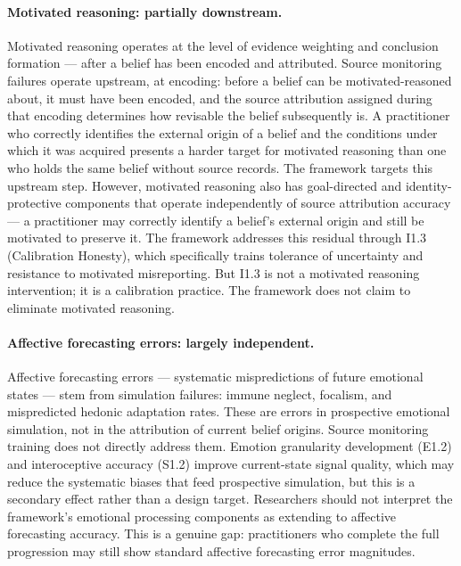 \documentclass[12pt, a4paper]{article}
\begin{document}
\paragraph{Motivated reasoning: partially downstream.}
Motivated reasoning operates at the level of evidence weighting and conclusion
formation --- after a belief has been encoded and attributed. Source monitoring
failures operate upstream, at encoding: before a belief can be motivated-reasoned
about, it must have been encoded, and the source attribution assigned during that
encoding determines how revisable the belief subsequently is. A practitioner who
correctly identifies the external origin of a belief and the conditions under
which it was acquired presents a harder target for motivated reasoning than one
who holds the same belief without source records. The framework targets this
upstream step. However, motivated reasoning also has goal-directed and
identity-protective components that operate independently of source attribution
accuracy --- a practitioner may correctly identify a belief's external origin and
still be motivated to preserve it. The framework addresses this residual through
I1.3 (Calibration Honesty), which specifically trains tolerance of uncertainty
and resistance to motivated misreporting. But I1.3 is not a motivated reasoning
intervention; it is a calibration practice. The framework does not claim to
eliminate motivated reasoning.

\paragraph{Affective forecasting errors: largely independent.}
Affective forecasting errors --- systematic mispredictions of future emotional
states --- stem from simulation failures: immune neglect, focalism, and
mispredicted hedonic adaptation rates. These are errors in prospective emotional
simulation, not in the attribution of current belief origins. Source monitoring
training does not directly address them. Emotion granularity development (E1.2)
and interoceptive accuracy (S1.2) improve current-state signal quality, which
may reduce the systematic biases that feed prospective simulation, but this is
a secondary effect rather than a design target. Researchers should not interpret
the framework's emotional processing components as extending to affective
forecasting accuracy. This is a genuine gap: practitioners who complete the full
progression may still show standard affective forecasting error magnitudes.
\end{document}
